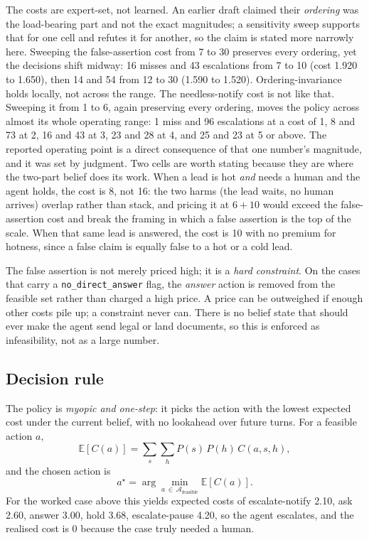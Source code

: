 \documentclass{article}
\begin{document}
The costs are expert-set, not learned. An earlier draft claimed their
\emph{ordering} was the load-bearing part and not the exact magnitudes; a
sensitivity sweep supports that for one cell and refutes it for another, so the
claim is stated more narrowly here. Sweeping the false-assertion cost from 7 to 30
preserves every ordering, yet the decisions shift midway: 16 misses and 43
escalations from 7 to 10 (cost 1.920 to 1.650), then 14 and 54 from 12 to 30 (1.590
to 1.520). Ordering-invariance holds locally, not across the range. The
needless-notify cost is not like that. Sweeping it from 1 to 6, again preserving
every ordering, moves the policy across almost its whole operating range: 1 miss and
96 escalations at a cost of 1, 8 and 73 at 2, 16 and 43 at 3, 23 and 28 at 4, and 25
and 23 at 5 or above. The reported operating point is a direct consequence of that
one number's magnitude, and it was set by judgment. Two cells are worth stating
because they are where the two-part belief does its work. When a lead is hot
\emph{and} needs a human and the agent holds, the cost is 8, not 16: the two
harms (the lead waits, no human arrives) overlap rather than stack, and pricing
it at $6+10$ would exceed the false-assertion cost and break the framing in
which a false assertion is the top of the scale. When that same lead is
answered, the cost is 10 with no premium for hotness, since a false claim is
equally false to a hot or a cold lead.

The false assertion is not merely priced high; it is a \emph{hard constraint}.
On the cases that carry a \texttt{no\_direct\_answer} flag, the \emph{answer}
action is removed from the feasible set rather than charged a high price. A
price can be outweighed if enough other costs pile up; a constraint never can.
There is no belief state that should ever make the agent send legal or land
documents, so this is enforced as infeasibility, not as a large number.

\subsection{Decision rule}
\label{sec:worked}
The policy is \emph{myopic and one-step}: it picks the action with the lowest
expected cost under the current belief, with no lookahead over future turns.
For a feasible action $a$,
\begin{equation}
\mathbb{E}[C(a)] = \sum_{s}\sum_{h} P(s)\,P(h)\,C(a, s, h),
\end{equation}
and the chosen action is
\begin{equation}
a^{\star} = \arg\min_{a \,\in\, \mathcal{A}_{\text{feasible}}} \mathbb{E}[C(a)].
\end{equation}
For the worked case above this yields expected costs of escalate-notify 2.10,
ask 2.60, answer 3.00, hold 3.68, escalate-pause 4.20, so the agent escalates,
and the realised cost is 0 because the case truly needed a human.
\end{document}
